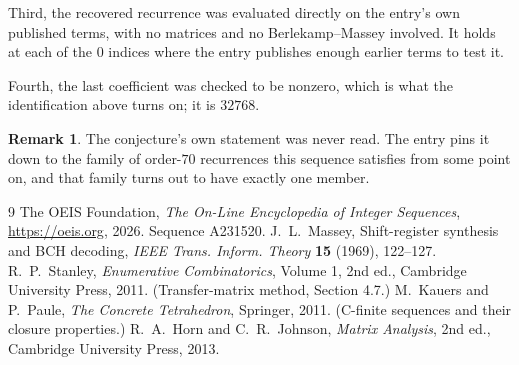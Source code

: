 \documentclass[11pt,a4paper]{article}
\theoremstyle{plain}
\theoremstyle{definition}
\newtheorem{remark}[theorem]{Remark}
\begin{document}
Third, the recovered recurrence was evaluated directly on the entry's own published terms, with
no matrices and no Berlekamp--Massey involved. It holds at each of the $0$ indices where
the entry publishes enough earlier terms to test it.

Fourth, the last coefficient was checked to be nonzero, which is what the identification above
turns on; it is $32768$.

\begin{remark}
The conjecture's own statement was never read. The entry pins it down to the family of
order-$70$ recurrences this sequence satisfies from some point on, and that family turns
out to have exactly one member.
\end{remark}

\begin{thebibliography}{9}
 The OEIS Foundation, \emph{The On-Line Encyclopedia of Integer
Sequences}, \url{https://oeis.org}, 2026. Sequence A231520.
 J.~L.~Massey, Shift-register synthesis and BCH decoding, \emph{IEEE
Trans. Inform. Theory} \textbf{15} (1969), 122--127.
 R.~P.~Stanley, \emph{Enumerative Combinatorics}, Volume 1, 2nd ed.,
Cambridge University Press, 2011. (Transfer-matrix method, Section 4.7.)
 M.~Kauers and P.~Paule, \emph{The Concrete Tetrahedron}, Springer, 2011.
(C-finite sequences and their closure properties.)
 R.~A.~Horn and C.~R.~Johnson, \emph{Matrix Analysis}, 2nd ed., Cambridge
University Press, 2013.
\end{thebibliography}
\end{document}

